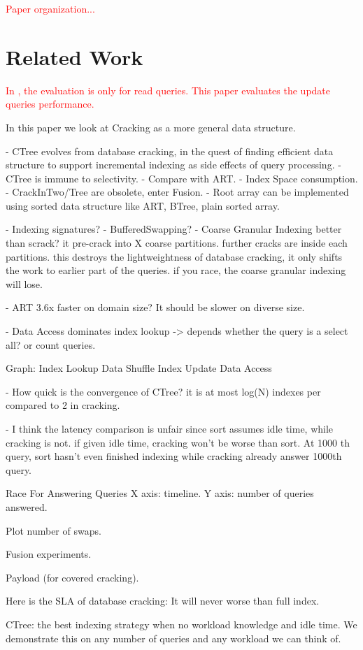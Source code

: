 \documentclass{sig-alternate}
\newcommand\todo[1]{\textcolor{red}{#1}}
\begin{document}
\todo{Paper organization...}

\section{Related Work}

\todo{In \cite{felix14uncracked}, the evaluation is only for read queries.
This paper evaluates the update queries performance.}

In this paper we look at Cracking as a more general data structure.

- CTree evolves from database cracking, in the quest of finding efficient data structure to support incremental indexing as side effects of query processing.
- CTree is immune to selectivity.
- Compare with ART.
- Index Space consumption.
- CrackInTwo/Tree are obsolete, enter Fusion.
- Root array can be implemented using sorted data structure like ART, BTree, plain sorted array.

- Indexing signatures?
- BufferedSwapping?
- Coarse Granular Indexing better than scrack? it pre-crack into X coarse partitions. further cracks are inside each partitions.
this destroys the lightweightness of database cracking, it only shifts the work to earlier part of the queries.
if you race, the coarse granular indexing will lose.

- ART 3.6x faster on domain size? It should be slower on diverse size.

- Data Access dominates index lookup -> depends whether the query is a select all? or count queries.

Graph:
Index Lookup
Data Shuffle
Index Update
Data Access

- How quick is the convergence of CTree? it is at most log(N) indexes per compared to 2 in cracking.

- I think the latency comparison is unfair since sort assumes idle time, while cracking is not. if given idle time, cracking won't be worse than sort.
At 1000 th query, sort hasn't even finished indexing while cracking already answer 1000th query.

Race For Answering Queries
X axis: timeline.
Y axis: number of queries answered.

Plot number of swaps.

Fusion experiments.

Payload (for covered cracking).


Here is the SLA of database cracking: It will never worse than full index.

CTree: the best indexing strategy when no workload knowledge and idle time.
We demonstrate this on any number of queries and any workload we can think of.
\end{document}
